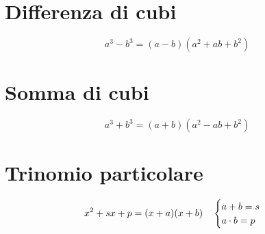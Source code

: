 \section{Differenza di cubi}
\begin{equation*}
a^3-b^3=(a-b)(a^2+ab+b^2)
\end{equation*}
\section{Somma di cubi}
\begin{equation*}
a^3+b^3=(a+b)(a^2-ab+b^2)
\end{equation*}
\section{Trinomio particolare}
\begin{equation*}
x^2+sx+p=(x+a)(x+b)\quad\begin{cases}
a+b=s\\
a\cdot b=p
\end{cases}\index{Scomposizione!trimomio!particolare}
\end{equation*}

